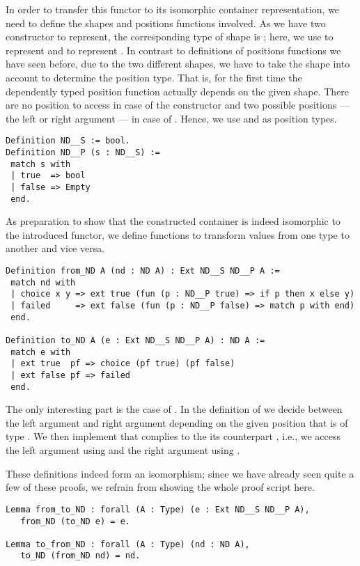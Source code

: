 In order to transfer this functor to its isomorphic container representation, we need to define the shapes and positions functions involved.
As we have two constructor to represent, the corresponding type of shape is ; here, we use  to represent  and  to represent .
In contrast to definitions of positions functions we have seen before, due to the two different shapes, we have to take the shape into account to determine the position type.
That is, for the first time the dependently typed position function actually depends on the given shape.
There are no position to access in case of the  constructor and two possible positions --- the left or right argument --- in case of .
Hence, we use  and  as position types.

\begin{verbatim}
Definition ND__S := bool.
Definition ND__P (s : ND__S) :=
 match s with
 | true  => bool
 | false => Empty
 end.
\end{verbatim}

As preparation to show that the constructed container is indeed isomorphic to the introduced functor, we define functions to transform values from one type to another and vice versa.

\begin{verbatim}
Definition from_ND A (nd : ND A) : Ext ND__S ND__P A :=
 match nd with
 | choice x y => ext true (fun (p : ND__P true) => if p then x else y)
 | failed     => ext false (fun (p : ND__P false) => match p with end)
 end.

Definition to_ND A (e : Ext ND__S ND__P A) : ND A :=
 match e with
 | ext true  pf => choice (pf true) (pf false)
 | ext false pf => failed
 end.
\end{verbatim}

The only interesting part is the case of .
In the definition of  we decide between the left argument  and right argument  depending on the given position  that is of type .
We then implement  that complies to the its counterpart , i.e., we access the left argument using  and the right argument using .

These definitions indeed form an isomorphism; since we have already seen quite a few of these proofs, we refrain from showing the whole proof script here.

\begin{verbatim}
Lemma from_to_ND : forall (A : Type) (e : Ext ND__S ND__P A),
   from_ND (to_ND e) = e.

Lemma to_from_ND : forall (A : Type) (nd : ND A),
   to_ND (from_ND nd) = nd.
\end{verbatim}

